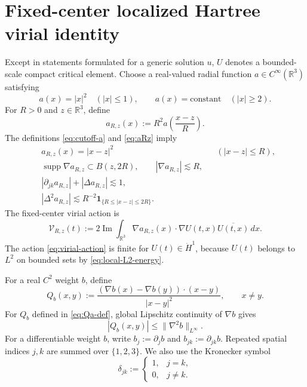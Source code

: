 \documentclass[preprint,12pt]{elsarticle}
\numberwithin{equation}{section}
\theoremstyle{remark}
\newcommand{\R}{\mathbb R}
\newcommand{\dd}{\,d}
\newcommand{\Vcal}{\mathcal V}
\newcommand{\one}{\mathbf 1}
\begin{document}
\section{Fixed-center localized Hartree virial identity}

Except in statements formulated for a generic solution $u$, $U$ denotes a bounded-scale compact critical element. Choose a real-valued radial function $a\in C^\infty(\R^3)$ satisfying
\begin{equation}\label{eq:cutoff-a}
  a(x)=|x|^2\quad(|x|\le1),
  \qquad
  a(x)=\text{constant}\quad(|x|\ge2).
\end{equation}
For $R>0$ and $z\in\R^3$, define
\begin{equation}\label{eq:aRz}
  a_{R,z}(x):=R^2a\left(\frac{x-z}{R}\right).
\end{equation}
The definitions \eqref{eq:cutoff-a} and \eqref{eq:aRz} imply
\begin{align}
  &a_{R,z}(x)=|x-z|^2 && (|x-z|\le R),
  \label{eq:aR-quadratic}\\
  &\operatorname{supp}\nabla a_{R,z}\subset B(z,2R),
  \qquad |\nabla a_{R,z}|\lesssim R,
  \label{eq:aR-gradient}\\
  &|\partial_{jk}a_{R,z}|+|\Delta a_{R,z}|\lesssim1,
  \label{eq:aR-second}\\
  &|\Delta^2a_{R,z}|
  \lesssim R^{-2}\one_{\{R\le|x-z|\le2R\}}.
  \label{eq:aR-fourth}
\end{align}
The fixed-center virial action is
\begin{equation}\label{eq:virial-action}
  \Vcal_{R,z}(t)
  :=2\operatorname{Im}
  \int_{\R^3}\nabla a_{R,z}(x)\cdot\nabla U(t,x)\overline{U(t,x)}\dd x.
\end{equation}
The action \eqref{eq:virial-action} is finite for $U(t)\in\dot H^1$, because $U(t)$ belongs to $L^2$ on bounded sets by \eqref{eq:local-L2-energy}.

For a real $C^2$ weight $b$, define
\begin{equation}\label{eq:Qa-def}
  Q_b(x,y)
  :=\frac{(\nabla b(x)-\nabla b(y))\cdot(x-y)}{|x-y|^2},
  \qquad x\ne y.
\end{equation}
For $Q_b$ defined in \eqref{eq:Qa-def}, global Lipschitz continuity of $\nabla b$ gives
\begin{equation}\label{eq:Qa-bound}
  |Q_b(x,y)|\le\|\nabla^2b\|_{L^\infty}.
\end{equation}
For a differentiable weight $b$, write $b_j:=\partial_jb$ and $b_{jk}:=\partial_{jk}b$. Repeated spatial indices $j,k$ are summed over $\{1,2,3\}$. We also use the Kronecker symbol
\begin{equation*}
  \delta_{jk}:=\begin{cases}1,&j=k,\\0,&j\ne k.\end{cases}
\end{equation*}
\end{document}
